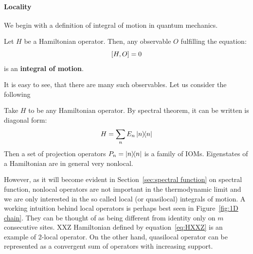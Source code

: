 \paragraph{Locality} We begin with a definition of integral of motion in quantum mechanics.
\begin{definition}
  Let \(H\) be a Hamiltonian operator. Then, any observable \(O\) fulfilling the equation:
  \[
    \comm{H}{O} = 0
  \]
  is an \textbf{integral of motion}.\label{def:iom}
\end{definition}
It is easy to see, that there are many such observables. Let us consider the following
\begin{example}
  Take \(H\) to be any Hamiltonian operator. By spectral theorem, it can be written is diagonal form:
  \begin{equation*}
    H = \sum_n E_n \ketbra{n}{n}
  \end{equation*}
  Then a set of projection operators \(P_n = \ketbra{n}{n}\) is a family of IOMs.
  Eigenstates of a Hamiltonian are in general very nonlocal.\label{ex: projectors}
\end{example}
However, as it will become evident in Section~\ref{sec:spectral function} on spectral function, nonlocal operators are not important in the
thermodynamic limit and we are only interested in the so called local (or quasilocal) integrals of motion.
A working intuition behind local operators is perhaps best seen in Figure~\ref{fig:1D chain}. They can be thought of as
being different from identity only on \(m\) consecutive sites. XXZ Hamiltonian defined by equation~\eqref{eq:HXXZ} is an
example of 2-local operator. On the other hand, quasilocal operator can be represented as a convergent sum of operators
with increasing support.
